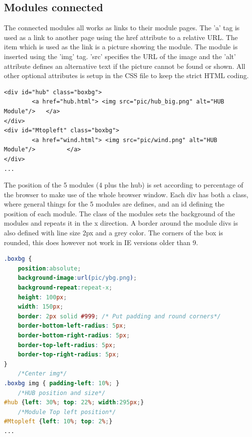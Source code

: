 \subsection{Modules connected}
The connected modules all works as links to their module pages. The 'a' tag is used as a link to another page using the href attribute to a relative URL. The item which is used as the link is a picture showing the module. The module is inserted using the 'img' tag. 'src' specifies the URL of the image and the 'alt' attribute defines an alternative text if the picture cannot be found or shown. All other optional attributes is setup in the CSS file to keep the strict HTML coding.
\begin{lstlisting}
<div id="hub" class="boxbg">
		<a href="hub.html"> <img src="pic/hub_big.png" alt="HUB Module"/> 	</a>
</div>
<div id="Mtopleft" class="boxbg">
		<a href="wind.html"> <img src="pic/wind.png" alt="HUB Module"/> 		</a>
</div>
...
\end{lstlisting}
The position of the 5 modules (4 plus the hub) is set according to percentage of the browser to make use of the whole browser window. Each div has both a class, where general things for the 5 modules are defines, and an id defining the position of each module. The class of the modules sets the background of the modules and repeats it in the x direction. A border around the module divs is also defined with line size 2px and a grey color. The corners of the box is rounded, this does however not work in IE versions older than 9.
\begin{lstlisting}[language=CSS]
.boxbg {
	position:absolute;
	background-image:url(pic/ybg.png);
	background-repeat:repeat-x;
	height: 100px;
	width: 150px;
	border: 2px solid #999;	/* Put padding and round corners*/
	border-bottom-left-radius: 5px;
	border-bottom-right-radius: 5px;
	border-top-left-radius: 5px;
	border-top-right-radius: 5px;
}
	/*Center img*/
.boxbg img { padding-left: 10%; }
	/*HUB position and size*/
#hub {left: 30%; top: 22%; width:295px;}
	/*Module Top left position*/
#Mtopleft {left: 10%; top: 2%;}
...
\end{lstlisting}

